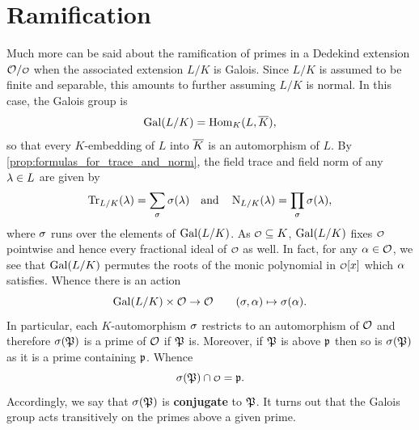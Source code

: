   \section{Ramification}
    Much more can be said about the ramification of primes in a Dedekind extension \(\mc{O}/\smc{O}\) when the associated extension \(L/K\) is Galois. Since \(L/K\) is assumed to be finite and separable, this amounts to further assuming \(L/K\) is normal. In this case, the Galois group is
    \[
      \operatorname{\mathrm{Gal}}(L/K) = \operatorname{\mathrm{Hom}}_{K}(L,\overline{K}),
    \]
    so that every \(K\)-embedding of \(L\) into \(\overline{K}\) is an automorphism of \(L\). By \cref{prop:formulas_for_trace_and_norm}, the field trace and field norm of any \(\lambda \in L\) are given by
    \[
      \operatorname{\mathrm{Tr}}_{L/K}(\lambda) = \sum_{\sigma}\sigma(\lambda) \quad \text{and} \quad \operatorname{\mathrm{N}}_{L/K}(\lambda) = \prod_{\sigma}\sigma(\lambda),
    \]
    where \(\sigma\) runs over the elements of \(\operatorname{\mathrm{Gal}}(L/K)\). As \(\smc{O} \subseteq K\), \(\operatorname{\mathrm{Gal}}(L/K)\) fixes \(\smc{O}\) pointwise and hence every fractional ideal of \(\smc{O}\) as well. In fact, for any \(\alpha \in \mathcal{O}\), we see that \(\operatorname{\mathrm{Gal}}(L/K)\) permutes the roots of the monic polynomial in \(\smc{O}[x]\) which \(\alpha\) satisfies. Whence there is an action
    \[
      \operatorname{\mathrm{Gal}}(L/K) \times \mathcal{O} \to \mathcal{O} \qquad (\sigma,\alpha) \mapsto \sigma(\alpha).
    \]
    In particular, each \(K\)-automorphism \(\sigma\) restricts to an automorphism of \(\mathcal{O}\) and therefore \(\sigma(\mathfrak{P})\) is a prime of \(\mathcal{O}\) if \(\mathfrak{P}\) is. Moreover, if \(\mathfrak{P}\) is above \(\mathfrak{p}\) then so is \(\sigma(\mathfrak{P})\) as it is a prime containing \(\mathfrak{p}\). Whence
    \[
      \s(\mf{P}) \cap \smc{O} = \mf{p}.
    \]
    Accordingly, we say that \(\sigma(\mathfrak{P})\) is \textbf{conjugate} to \(\mathfrak{P}\). It turns out that the Galois group acts transitively on the primes above a given prime.

